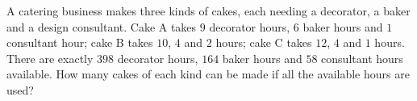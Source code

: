 A catering business makes three kinds of cakes, each needing a decorator, a baker and a design consultant. Cake A takes $9$ decorator hours, $6$ baker hours and $1$ consultant hour; cake B takes $10$, $4$ and $2$ hours; cake C takes $12$, $4$ and $1$ hours. There are exactly $398$ decorator hours, $164$ baker hours and $58$ consultant hours available. How many cakes of each kind can be made if all the available hours are used?
